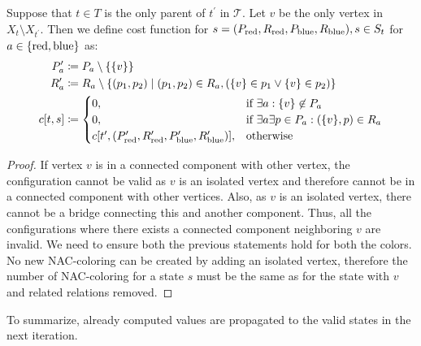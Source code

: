 Suppose that \( t \in T \) is
the only parent of \( t^\prime\) in \( \mathcal {T} \).
Let \( v \) be the only vertex in \( X_t \setminus X_{t^\prime} \).
Then we define cost function for \( s=(P_{\text{red}}, R_{\text{red}}, P_{\text{blue}}, R_{\text{blue}}), s \in S_t \)
for \( a \in \{\text{red}, \text{blue}\} \) as:
%
\begin{align*}
	P_a^\prime & \coloneqq P_a \setminus \{\{v\}\}                                                                    \notag \\
	R_a^\prime & \coloneqq R_a \setminus \{ (p_1, p_2) \mid (p_1, p_2) \in R_a, (\{v\} \in p_1 \lor \{v\} \in p_2) \} \notag \\
	c[t, s]    & \coloneqq
	\begin{cases}
		0,                                                                           & \text{if } \exists a : \{v\} \not\in P_a                    \\
		0,                                                                           & \text{if } \exists a \exists p \in P_a : (\{v\}, p) \in R_a \\
		c[t^\prime, (P_{\text{red}}^\prime, R_{\text{red}}^\prime, P_{\text{blue}}^\prime, R_{\text{blue}}^\prime)], & \text{otherwise}
	\end{cases}
\end{align*}
%
%
\begin{proof}
	If vertex \( v \) is in a connected component with other vertex,
	the configuration cannot be valid as \( v \) is an isolated vertex
	and therefore cannot be in a connected component with other vertices.
	Also, as \( v \) is an isolated vertex, there cannot be a bridge
	connecting this and another component.
	Thus, all the configurations where there exists
	a connected component neighboring \( v \) are invalid.
	We need to ensure both the previous statements hold for both the colors.
	No new NAC-coloring can be created by adding an isolated vertex,
	therefore the number of NAC-coloring for a state \( s \) must be the same
	as for the state with \( v \) and related relations removed.
\end{proof}
%
To summarize, already computed values are propagated to the valid states in the next iteration.

\subsection{\ForgetVertexNode}

